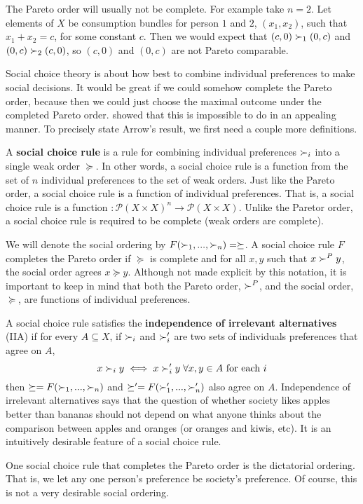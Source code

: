 The Pareto order will usually not be complete. For example take
$n=2$.  Let elements of $X$ be consumption bundles for person $1$ and
$2$, $(x_1,x_2)$, such that $x_1 + x_2 = c$, for some constant
$c$. Then we would expect that $(c,0) \succ_1 (0,c)$ and $(0,c)
\succ_2 (c,0)$, so $(c,0)$ and $(0,c)$ are not Pareto comparable. 

Social choice theory is about how best to combine individual
preferences to make social decisions.  It would be great if we could
somehow complete the Pareto order, because then we could just choose
the maximal outcome under the completed Pareto order.
\cite{arrow1950} showed that this is impossible to do in an appealing
manner. To precisely state Arrow's result, we first need a couple more
definitions. 

A \textbf{social choice rule} is a rule for combining individual
preferences $\succ_i$ into a single weak order $\succeq$. In other
words, a social choice rule is a function from
the set of $n$ individual preferences to the
set of weak orders. Just like the Pareto order, a social choice rule
is a function of individual preferences. That is, a  social choice
rule is a function $:\mathcal{P}(X \times X)^n \to \mathcal{P}(X
\times X)$. Unlike the Paretor order, a social choice rule is required
to be complete (weak orders are complete). 

We will denote the social ordering by
$F(\succ_1, ..., \succ_n) = \succeq$. A social choice rule $F$
completes the Pareto order if $\succeq$ is complete and for all $x,y$
such that $x \succ^P y$, the social order agrees $x \succeq
y$. Although not made explicit by this notation, it is important to
keep in mind that both the Pareto order, $\succ^P$, and the social
order, $\succeq$, are functions of individual preferences.

A social choice rule satisfies the \textbf{independence of irrelevant
  alternatives} (IIA) if for every $A \subseteq X$, if $\succ_i$ and
$\succ_i'$ are two sets of individuals preferences that agree on $A$,
\[ x \succ_i y \iff x \succ_i' y \; \forall x,y \in A \text{ for each
} i\] 
then $\succeq=F(\succ_1, ..., \succ_n)$ and $\succeq'=F(\succ_1', ...,
\succ_n')$ also agree on $A$. Independence 
of irrelevant alternatives says that the question of whether society
likes apples better than bananas should not depend on what anyone
thinks about the comparison between apples and oranges (or oranges and
kiwis, etc). It is an intuitively desirable feature of a social
choice rule.

One social choice rule that completes the Pareto order is the
dictatorial ordering. That is, we let any one person's preference be
society's preference. Of course, this is not a very desirable social
ordering.

